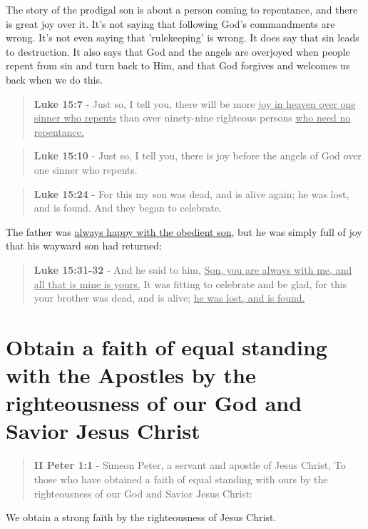 \documentclass[11pt]{article}
\begin{document}
The story of the prodigal son is about a person coming to repentance, and there is great joy over it.
It's not saying that following God's commandments are wrong.
It's not even saying that 'rulekeeping' is wrong.
It does say that sin leads to destruction.
It also says that God and the angels are overjoyed when people repent from sin and turn back to Him, and that God forgives and welcomes us back when we do this.

\begin{quote}
\textbf{Luke 15:7} - Just so, I tell you, there will be more \uline{joy in heaven over one sinner who repents} than over ninety-nine righteous persons \uline{who need no repentance.}
\end{quote}

\begin{quote}
\textbf{Luke 15:10} - Just so, I tell you, there is joy before the angels of God over one sinner who repents.
\end{quote}

\begin{quote}
\textbf{Luke 15:24} - For this my son was dead, and is alive again; he was lost, and is found. And they began to celebrate.
\end{quote}

The father was \uline{always happy with the obedient son}, but he was simply full of joy that his wayward son had returned:

\begin{quote}
\textbf{Luke 15:31-32} - And he said to him, \uline{Son, you are always with me, and all that is mine is yours.} It was fitting to celebrate and be glad, for this your brother was dead, and is alive; \uline{he was lost, and is found.}
\end{quote}

\section{Obtain a faith of equal standing with the Apostles by the righteousness of our God and Savior Jesus Christ}
\label{sec:org6905050}
\begin{quote}
\textbf{II Peter 1:1} - Simeon Peter, a servant and apostle of Jesus Christ, To those who have obtained a faith of equal standing with ours by the righteousness of our God and Savior Jesus Christ:
\end{quote}

We obtain a strong faith by the righteousness of Jesus Christ.
\end{document}
